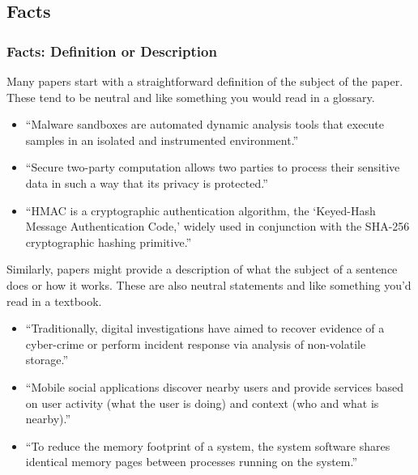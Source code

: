 \documentclass[sigconf]{acmart}
\begin{document}
	\subsection{Facts}
	\subsubsection{Facts: Definition or Description}




	Many papers start with a straightforward definition of the subject of the paper. These tend to be neutral and like something you would read in a glossary.

	\begin{itemize}

		\item	``Malware sandboxes are automated dynamic analysis tools that execute samples in an isolated and instrumented environment.''~\cite{graziano2015needles}

		\item	``Secure two-party computation allows two parties to process their sensitive data in such a way that its privacy is protected.''~\cite{demmler2014}

		\item	``HMAC is a cryptographic authentication algorithm, the ‘Keyed-Hash Message Authentication Code,’ widely used in conjunction with the SHA-256 cryptographic hashing primitive.''~\cite{beringer2015verified}

	\end{itemize}

	Similarly, papers might provide a description of what the subject of a sentence does or how it works. These are also neutral statements and like something you’d read in a textbook.

	\begin{itemize}

		\item	``Traditionally, digital investigations have aimed to recover evidence of a cyber-crime or perform incident response via analysis of non-volatile storage.''~\cite{saltaformaggio2014dscrete}

		\item	``Mobile social applications discover nearby users and provide services based on user activity (what the user is doing) and context (who and what is nearby).''~\cite{lentz2014sddr}

		\item	``To reduce the memory footprint of a system, the system software shares identical memory pages between processes running on the system.''~\cite{yarom2014flush+}
	\end{itemize}
\end{document}
